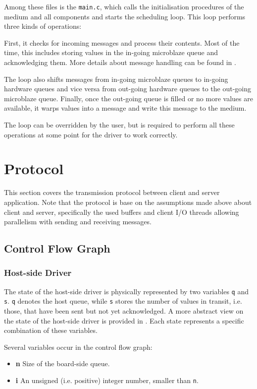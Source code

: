 \documentclass{report}
\begin{document}
Among these files is the \texttt{main.c}, which calls the initialisation procedures of the medium and all components and starts the scheduling loop. This loop performs three kinds of operations:

First, it checks for incoming messages and process their contents. Most of the time, this includes storing values in the in-going microblaze queue and acknowledging them. More details about message handling can be found in .

The loop also shifts messages from in-going microblaze queues to in-going hardware queues and vice versa from out-going hardware queues to the out-going microblaze queue. Finally, once the out-going queue is filled or no more values are available, it warps values into a message and write this message to the medium. 

The loop can be overridden by the user, but is required to perform all these operations at some point for the driver to work correctly.

\newpage
\section{Protocol}
\label{sec:protocol}
This section covers the transmission protocol between client and server application. Note that the protocol is base on the assumptions made above about client and server, specifically the used buffers and client I/O threads allowing parallelism with sending and receiving messages.

\subsection{Control Flow Graph}
\label{sec:cfg}

\subsubsection{Host-side Driver}
The state of the host-side driver is physically represented by two variables \texttt{q} and \texttt{s}. \texttt{q} denotes the host queue, while \texttt{s} stores the number of values in transit, i.e. those, that have been sent but not yet acknowledged. A more abstract view on the state of the host-side driver is provided in . Each state represents a specific combination of these variables.

Several variables occur in the control flow graph:
\begin{itemize} \itemsep1pt \parskip0pt 
\item \textbf{n} Size of the board-side queue.
\item \textbf{i} An unsigned (i.e. positive) integer number, smaller than \texttt{n}.
\end{itemize}
\end{document}
